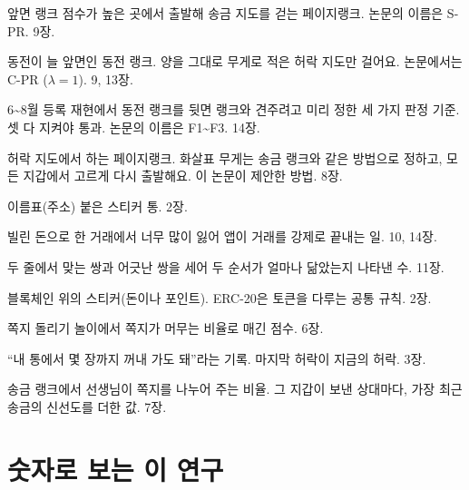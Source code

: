 \begin{description}[leftmargin=0pt, itemsep=0.35em, font=\normalfont\bfseries\color{inkblue}]
\item[씨앗 랭크] 앞면 랭크 점수가 높은 곳에서 출발해 송금 지도를 걷는 페이지랭크. 논문의 이름은 S-PR. 9장.
\item[앞면 랭크] 동전이 늘 앞면인 동전 랭크. 양을 그대로 무게로 적은 허락 지도만 걸어요. 논문에서는 C-PR ($\lambda=1$). 9, 13장.
\item[약속 1\textasciitilde{}3] 6\textasciitilde{}8월 등록 재현에서 동전 랭크를 뒷면 랭크와 견주려고 미리 정한 세 가지 판정 기준. 셋 다 지켜야 통과. 논문의 이름은 F1\textasciitilde{}F3. 14장.
\item[엔도스랭크] 허락 지도에서 하는 페이지랭크. 화살표 무게는 송금 랭크와 같은 방법으로 정하고, 모든 지갑에서 고르게 다시 출발해요. 이 논문이 제안한 방법. 8장.
\item[지갑] 이름표(주소) 붙은 스티커 통. 2장.
\item[청산] 빌린 돈으로 한 거래에서 너무 많이 잃어 앱이 거래를 강제로 끝내는 일. 10, 14장.
\item[켄달의 타우 ($\tau$)] 두 줄에서 맞는 쌍과 어긋난 쌍을 세어 두 순서가 얼마나 닮았는지 나타낸 수. 11장.
\item[토큰] 블록체인 위의 스티커(돈이나 포인트). ERC-20은 토큰을 다루는 공통 규칙. 2장.
\item[페이지랭크] 쪽지 돌리기 놀이에서 쪽지가 머무는 비율로 매긴 점수. 6장.
\item[허락] “내 통에서 몇 장까지 꺼내 가도 돼”라는 기록. 마지막 허락이 지금의 허락. 3장.
\item[활발함] 송금 랭크에서 선생님이 쪽지를 나누어 주는 비율. 그 지갑이 보낸 상대마다, 가장 최근 송금의 신선도를 더한 값. 7장.
\end{description}

\chapter{숫자로 보는 이 연구}

